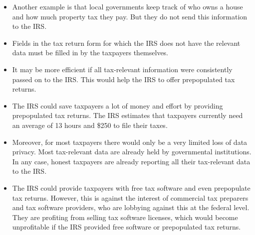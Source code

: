 \documentclass[11pt]{article}
\begin{document}
\begin{itemize}
    \item Another example is that local governments keep track of who owns a house and how much property tax they pay. But they do not send this information to the IRS. %
    \item Fields in the tax return form for which the IRS does not have the relevant data must be filled in by the taxpayers themselves.
    \item It may be more efficient if all tax-relevant information were consistently passed on to the IRS. This would help the IRS to offer prepopulated tax returns.
    \item The IRS could save taxpayers a lot of money and effort by providing prepopulated tax returns. The IRS estimates that taxpayers currently need an average of 13 hours and \$250 to file their taxes.
    \item Moreover, for most taxpayers there would only be a very limited loss of data privacy. Most tax-relevant data are already held by governmental institutions. In any case, honest taxpayers are already reporting all their tax-relevant data to the IRS. 
    \item The IRS could provide taxpayers with free tax software and even prepopulate tax returns. However, this is against the interest of commercial tax preparers and tax software providers, who are lobbying against this at the federal level. They are profiting from selling tax software licenses, which would become unprofitable if the IRS provided free software or prepopulated tax returns. 
\end{itemize}
\end{document}
